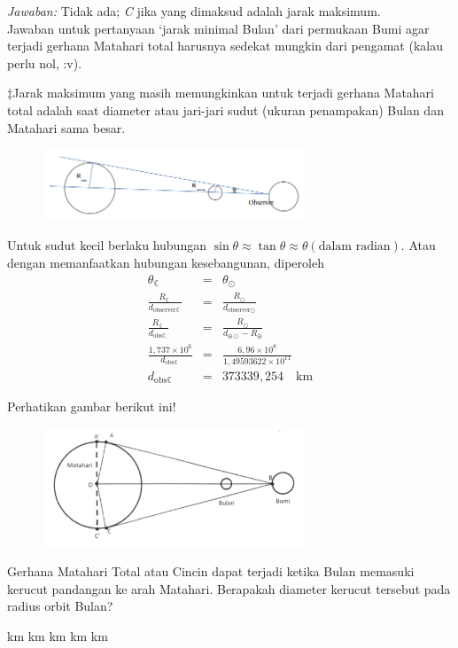 \documentclass[11pt,fleqn, a4paper]{exam}
\begin{document}
\begin{questions}
\textit{Jawaban: } Tidak ada; \textit{C} jika yang dimaksud adalah jarak maksimum.\\
Jawaban untuk pertanyaan `jarak minimal Bulan' dari permukaan Bumi agar terjadi gerhana Matahari total harusnya sedekat mungkin dari pengamat (kalau perlu nol, :v). 

$\ddagger$Jarak maksimum yang masih memungkinkan untuk terjadi gerhana Matahari total adalah saat diameter atau jari-jari sudut (ukuran penampakan) Bulan dan Matahari sama besar. 
\begin{figure}[H]
\centering
\includegraphics[width=0.7\textwidth]{gambar/osk2016_21.png}
\end{figure}
Untuk sudut kecil berlaku hubungan $\sin{\theta} \approx \tan{\theta} \approx \theta (\text{dalam radian})$. Atau dengan memanfaatkan hubungan kesebangunan, diperoleh
\begin{eqnarray*}
\theta_{\leftmoon} &=& \theta_{\odot}\\
\frac{R_{\leftmoon}}{d_{\text{observer} \leftmoon}} &=& \frac{R_{\odot}}{d_{\text{observer} \odot}} \\
\frac{R_{\leftmoon}}{d_{\text{obs} \leftmoon}} &=& \frac{R_{\odot}}{d_{\oplus \odot} - R_{\oplus}} \\
\frac{1,737 \times 10^{6}}{d_{\text{obs} \leftmoon}} &=& \frac{6,96 \times 10^{8}}{1,49593622 \times 10^{11}}\\
d_{\text{obs} \leftmoon} &=& 373339,254 \quad \text{km}
\end{eqnarray*}


\vspace{0.5cm}
\question Perhatikan gambar berikut ini!
\begin{figure}[H]
\centering
\includegraphics[width=0.7\textwidth]{gambar/osk2016_22.png}
\end{figure}
Gerhana Matahari Total atau Cincin dapat terjadi ketika Bulan memasuki kerucut pandangan ke arah Matahari. Berapakah diameter kerucut tersebut pada radius orbit Bulan?
\begin{choices}
 km
 km
 km
 km
 km
\end{choices}


\end{questions}
\end{document}
